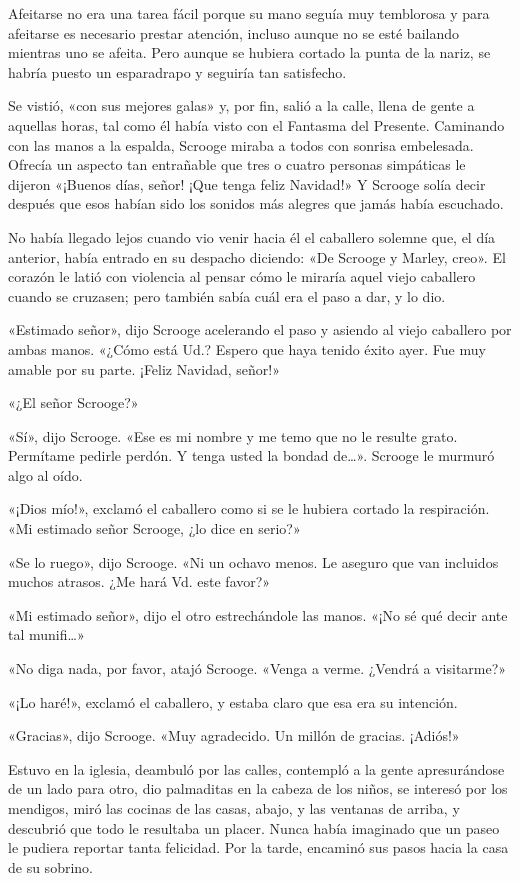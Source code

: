 \documentclass{novela}
\begin{document}
 Afeitarse no era una tarea fácil porque su mano seguía muy temblorosa y para afeitarse es necesario prestar atención, incluso aunque no se esté bailando mientras uno se afeita. Pero aunque se hubiera cortado la punta de la nariz, se habría puesto un esparadrapo y seguiría tan satisfecho.

 Se vistió, «con sus mejores galas» y, por fin, salió a la calle, llena de gente a aquellas horas, tal como él había visto con el Fantasma del Presente. Caminando con las manos a la espalda, Scrooge miraba a todos con sonrisa embelesada. Ofrecía un aspecto tan entrañable que tres o cuatro personas simpáticas le dijeron «¡Buenos días, señor! ¡Que tenga feliz Navidad!» Y Scrooge solía decir después que esos habían sido los sonidos más alegres que jamás había escuchado.

 No había llegado lejos cuando vio venir hacia él el caballero solemne que, el día anterior, había entrado en su despacho diciendo: «De Scrooge y Marley, creo». El corazón le latió con violencia al pensar cómo le miraría aquel viejo caballero cuando se cruzasen; pero también sabía cuál era el paso a dar, y lo dio.



 «Estimado señor», dijo Scrooge acelerando el paso y asiendo al viejo caballero por ambas manos. «¿Cómo está Ud.? Espero que haya tenido éxito ayer. Fue muy amable por su parte. ¡Feliz Navidad, señor!»

 «¿El señor Scrooge?»

 «Sí», dijo Scrooge. «Ese es mi nombre y me temo que no le resulte grato. Permítame pedirle perdón. Y tenga usted la bondad de{\ldots}». Scrooge le murmuró algo al oído.

 «¡Dios mío!», exclamó el caballero como si se le hubiera cortado la respiración. «Mi estimado señor Scrooge, ¿lo dice en serio?»

 «Se lo ruego», dijo Scrooge. «Ni un ochavo menos. Le aseguro que van incluidos muchos atrasos. ¿Me hará Vd. este favor?»

 «Mi estimado señor», dijo el otro estrechándole las manos. «¡No sé qué decir ante tal munifi{\ldots}»

 «No diga nada, por favor, atajó Scrooge. «Venga a verme. ¿Vendrá a visitarme?»

 «¡Lo haré!», exclamó el caballero, y estaba claro que esa era su intención.

 «Gracias», dijo Scrooge. «Muy agradecido. Un millón de gracias. ¡Adiós!»

 Estuvo en la iglesia, deambuló por las calles, contempló a la gente apresurándose de un lado para otro, dio palmaditas en la cabeza de los niños, se interesó por los mendigos, miró las cocinas de las casas, abajo, y las ventanas de arriba, y descubrió que todo le resultaba un placer. Nunca había imaginado que un paseo le pudiera reportar tanta felicidad. Por la tarde, encaminó sus pasos hacia la casa de su sobrino.
\end{document}
